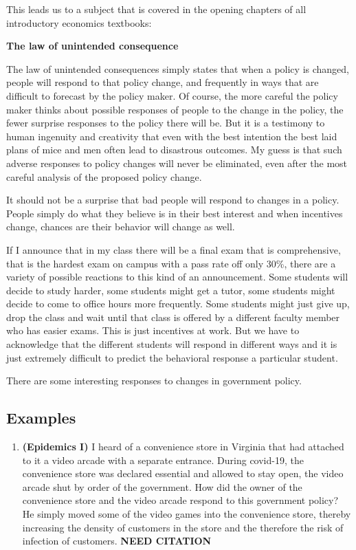 \documentclass[
]{book}
\providecommand{\tightlist}{%
  \setlength{\itemsep}{0pt}\setlength{\parskip}{0pt}}
\begin{document}
This leads us to a subject that is covered in the opening chapters of all introductory economics textbooks:

\textbf{The law of unintended consequence}

The law of unintended consequences simply states that when a policy is changed, people will respond to that policy change, and frequently in ways that are difficult to forecast by the policy maker. Of course, the more careful the policy maker thinks about possible responses of people to the change in the policy, the fewer surprise responses to the policy there will be. But it is a testimony to human ingenuity and creativity that even with the best intention the best laid plans of mice and men often lead to disastrous outcomes. My guess is that such adverse responses to policy changes will never be eliminated, even after the most careful analysis of the proposed policy change.

It should not be a surprise that bad people will respond to changes in a policy. People simply do what they believe is in their best interest and when incentives change, chances are their behavior will change as well.

If I announce that in my class there will be a final exam that is comprehensive, that is the hardest exam on campus with a pass rate off only 30\%, there are a variety of possible reactions to this kind of an announcement. Some students will decide to study harder, some students might get a tutor, some students might decide to come to office hours more frequently. Some students might just give up, drop the class and wait until that class is offered by a different faculty member who has easier exams. This is just incentives at work. But we have to acknowledge that the different students will respond in different ways and it is just extremely difficult to predict the behavioral response a particular student.

There are some interesting responses to changes in government policy.

\hypertarget{examples}{%
\subsection{Examples}\label{examples}}

\begin{enumerate}
\def\labelenumi{\arabic{enumi}.}
\tightlist
\item
  \textbf{(Epidemics I)} I heard of a convenience store in Virginia that had attached to it a video arcade with a separate entrance. During covid-19, the convenience store was declared essential and allowed to stay open, the video arcade shut by order of the government. How did the owner of the convenience store and the video arcade respond to this government policy? He simply moved some of the video games into the convenience store, thereby increasing the density of customers in the store and the therefore the risk of infection of customers. \textbf{NEED CITATION}
\end{enumerate}
\end{document}
